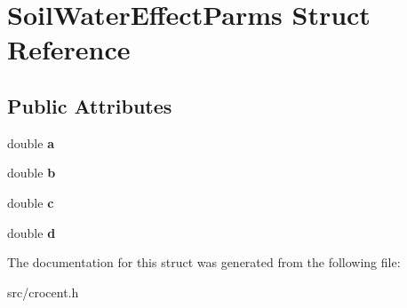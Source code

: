 \hypertarget{struct_soil_water_effect_parms}{\section{Soil\-Water\-Effect\-Parms Struct Reference}
\label{struct_soil_water_effect_parms}
}
\subsection*{Public Attributes}
\begin{DoxyCompactItemize}
\item 
\hypertarget{struct_soil_water_effect_parms_adc0ccae6f192cb4d2247e1d8f11525ba}{double {\bfseries a}}\label{struct_soil_water_effect_parms_adc0ccae6f192cb4d2247e1d8f11525ba}

\item 
\hypertarget{struct_soil_water_effect_parms_a650534cd61fc11dbc23ce07d08e5d580}{double {\bfseries b}}\label{struct_soil_water_effect_parms_a650534cd61fc11dbc23ce07d08e5d580}

\item 
\hypertarget{struct_soil_water_effect_parms_a9b1cc61c68139884bb752abcddab61f8}{double {\bfseries c}}\label{struct_soil_water_effect_parms_a9b1cc61c68139884bb752abcddab61f8}

\item 
\hypertarget{struct_soil_water_effect_parms_a171720bdd0bd1677a561f3a617dc92c2}{double {\bfseries d}}\label{struct_soil_water_effect_parms_a171720bdd0bd1677a561f3a617dc92c2}

\end{DoxyCompactItemize}


The documentation for this struct was generated from the following file\-:\begin{DoxyCompactItemize}
\item 
src/crocent.\-h\end{DoxyCompactItemize}

